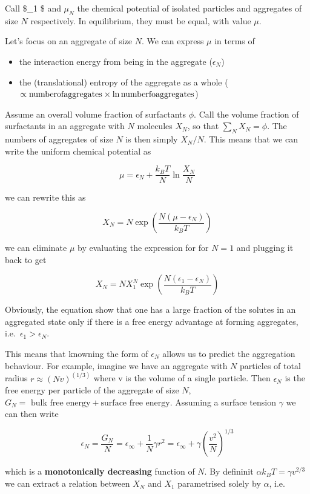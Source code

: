 \documentclass[
  letterpaper,
  enabledeprecatedfontcommands]{report}
\providecommand{\tightlist}{%
  \setlength{\itemsep}{0pt}\setlength{\parskip}{0pt}}
\begin{document}
Call \$\mu\_1 \$ and \(\mu_N\) the chemical potential of isolated
particles and aggregates of size \(N\) respectively. In equilibrium,
they must be equal, with value \(\mu\).

Let's focus on an aggregate of size \(N\). We can express \(\mu\) in
terms of

\begin{itemize}
\tightlist
\item
  the interaction energy from being in the aggregate (\(\epsilon_N\))
\item
  the (translational) entropy of the aggregate as a whole
  (\(\propto {\rm number of aggregates}\times \ln {\rm number fo aggregates}\))
\end{itemize}

Assume an overall volume fraction of surfactants \(\phi\). Call the
volume fraction of surfactants in an aggregate with \(N\) molecules
\(X_N\), so that \(\sum_N X_N = \phi\). The numbers of aggregates of
size \(N\) is then simply \(X_N/N\). This means that we can write the
uniform chemical potential as

\[\mu = \epsilon_N + \dfrac{k_B T}{N}\ln{\dfrac{X_N}{N}}\]

we can rewrite this as

\[X_N = N \exp{\left( \dfrac{N(\mu-\epsilon_N)}{k_BT}\right)}\]

we can eliminate \(\mu\) by evaluating the expression for for \(N=1\)
and plugging it back to get

\[X_N = N X_1^N \exp{\left( \dfrac{N(\epsilon_1-\epsilon_N)}{k_BT}\right)}\]

Obviously, the equation show that one has a large fraction of the
solutes in an aggregated state only if there is a free energy advantage
at forming aggregates, i.e.~\(\epsilon_1>\epsilon_N\).

This means that knowning the form of \(\epsilon_N\) allows us to predict
the aggregation behaviour. For example, imagine we have an aggregate
with \(N\) particles of total radius \(r\approx (Nv)^(1/3)\) where v is
the volume of a single particle. Then \(\epsilon_N\) is the free energy
per particle of the aggregate of size \(N\),
\(G_N=\text{ bulk free energy}+\text{surface free energy}\). Assuming a
surface tension \(\gamma\) we can then write

\[\epsilon_N = \dfrac{G_N}{N} = \epsilon_\infty  +\dfrac{1}{N}\gamma r^2 =\epsilon_\infty +\gamma\left(\dfrac{v^2}{N}\right)^{1/3}\]

which is a \textbf{monotonically decreasing} function of \(N\). By
defininit \(\alpha k_B T = \gamma v^{2/3}\) we can extract a relation
between \(X_N\) and \(X_1\) parametrised solely by \(\alpha\), i.e.
\end{document}
